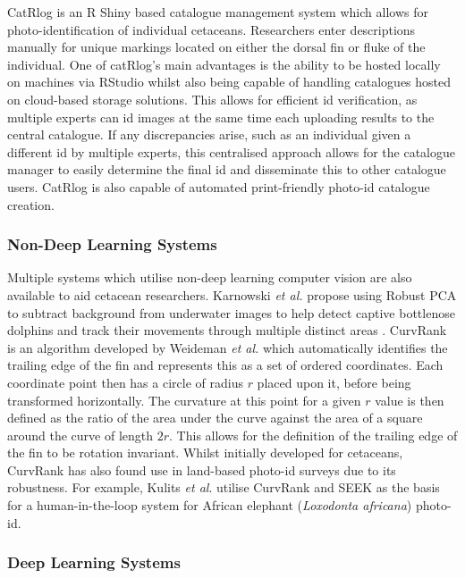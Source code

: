 CatRlog \cite{keen_catrlog_2021} is an R Shiny based catalogue management system which allows for photo-identification of individual cetaceans. Researchers enter descriptions manually for unique markings located on either the dorsal fin or fluke of the individual. One of catRlog's main advantages is the ability to be hosted locally on machines via RStudio whilst also being capable of handling catalogues hosted on cloud-based storage solutions. This allows for efficient id verification, as multiple experts can id images at the same time each uploading results to the central catalogue. If any discrepancies arise, such as an individual given a different id by multiple experts, this centralised approach allows for the catalogue manager to easily determine the final id and disseminate this to other catalogue users. CatRlog is also capable of automated print-friendly photo-id catalogue creation. 

\subsubsection{Non-Deep Learning Systems}\label{ch:Background,sec:conTech,sub:photoIDAides,subsub:nonDL}

Multiple systems which utilise non-deep learning computer vision are also available to aid cetacean researchers. Karnowski \textit{et al.} propose using Robust PCA to subtract background from underwater images to help detect captive bottlenose dolphins and track their movements through multiple distinct areas \cite{karnowski_dolphin_2015}. CurvRank is an algorithm developed by Weideman \textit{et al.} \cite{weideman_integral_2017} which automatically identifies the trailing edge of the fin and represents this as a set of ordered coordinates. Each coordinate point then has a circle of radius $r$ placed upon it, before being transformed horizontally. The curvature at this point for a given $r$ value is then defined as the ratio of the area under the curve against the area of a square around the curve of length $2r$. This allows for the definition of the trailing edge of the fin to be rotation invariant. Whilst initially developed for cetaceans, CurvRank has also found use in land-based photo-id surveys due to its robustness. For example, Kulits \textit{et al}. \cite{kulits_elephantbook_2021} utilise CurvRank and SEEK \cite{bedetti_system_2020} as the basis for a human-in-the-loop system for African elephant (\textit{Loxodonta africana}) photo-id. 

\subsubsection{Deep Learning Systems}\label{ch:Background,sec:conTech,sub:photoIDAides,subsub:DL}


